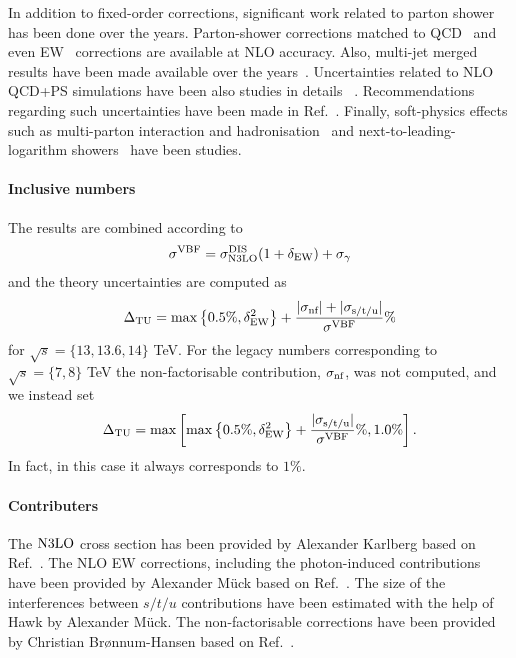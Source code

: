 In addition to fixed-order corrections, significant work related to parton shower has been done over the years.
Parton-shower corrections matched to QCD~\cite{Nason:2009ai,Frixione:2013mta} and even EW~\cite{Jager:2022acp} corrections are available at NLO accuracy.
Also, multi-jet merged results have been made available over the years~\cite{Hoche:2021mkv,Chen:2021phj}.
Uncertainties related to NLO QCD+PS simulations have been also studies in details ~\cite{Jager:2020hkz,Buckley:2021gfw,Hoche:2021mkv}.
Recommendations regarding such uncertainties have been made in Ref.~\cite{TOBEADDED}.
Finally, soft-physics effects such as multi-parton interaction and hadronisation~\cite{Hoche:2021mkv,Bittrich:2021ztq} and next-to-leading-logarithm showers~\cite{vanBeekveld:2023chs} have been studies.

\paragraph{Inclusive numbers}

The results are combined according to
\begin{align}
  \label{eq:vbf-xsec-combined}
  \sigma^{\mathrm{VBF}} = \sigma_{\mathrm{N3LO}}^{\mathrm{DIS}} (1+\delta_{\mathrm{EW}}) + \sigma_{\gamma}
\end{align}
and the theory uncertainties are computed as
\begin{align}
  \label{eq:vbf-TU}
  \Delta_{\mathrm{TU}} = \max\left\{0.5\%,\delta_{\mathrm{EW}}^2\right\} + \frac{|\sigma_{\mbox{\scriptsize nf}}| + |\sigma_{\mbox{\scriptsize s/t/u}}|}{\sigma^{\mathrm{VBF}}}\%
\end{align}
for $\sqrt{s}=\{13,13.6,14\}$ TeV. For the legacy numbers corresponding to $\sqrt{s}=\{7,8\}$ TeV the non-factorisable contribution, $\sigma_{\mbox{\scriptsize nf}}$, was not computed, and we instead set
\begin{align}
  \label{eq:vbf-TU}
  \Delta_{\mathrm{TU}} = \max\left[\max\left\{0.5\%,\delta_{\mathrm{EW}}^2\right\} + \frac{|\sigma_{\mbox{\scriptsize s/t/u}}|}{\sigma^{\mathrm{VBF}}}\%,1.0\%\right].
\end{align}
In fact, in this case it always corresponds to $1\%$.

\paragraph{Contributers}

The $\mathrm{N3LO}$ cross section has been provided by Alexander Karlberg based on Ref.~\cite{Dreyer:2016oyx}.
The NLO EW corrections, including the photon-induced contributions have been provided by Alexander M\"uck based on Ref.~\cite{Denner:2014cla}.
The size of the interferences between $s/t/u$ contributions have been estimated with the help of {\sc Hawk} by Alexander Mück.
The non-factorisable corrections have been provided by Christian Br{\o}nnum-Hansen based on Ref.~\cite{????}.
